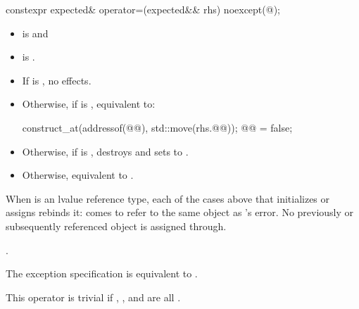 %
\begin{itemdecl}
constexpr expected& operator=(expected&& rhs) noexcept(@\seebelow@);
\end{itemdecl}

\begin{itemdescr}
\pnum
\constraints
\begin{itemize}
\item
{} is  and
\item
{} is .
\end{itemize}

\pnum
\effects
\begin{itemize}
\item
If  is , no effects.
\item
Otherwise, if  is , equivalent to:
\begin{codeblock}
construct_at(addressof(@@), std::move(rhs.@@));
@@ = false;
\end{codeblock}
\item
Otherwise, if  is ,
destroys  and sets  to .
\item
Otherwise, equivalent to .
\end{itemize}

\begin{addedblock}
\pnum
When  is an lvalue reference type, each of the cases above that
initializes or assigns  rebinds it:  comes to
refer to the same object as 's error. No previously or
subsequently referenced object is assigned through.
\end{addedblock}

\pnum
\returns
{}.

\pnum
\remarks
The exception specification is equivalent to
.

\pnum
This operator is trivial if
,
, and
are all .
\end{itemdescr}

